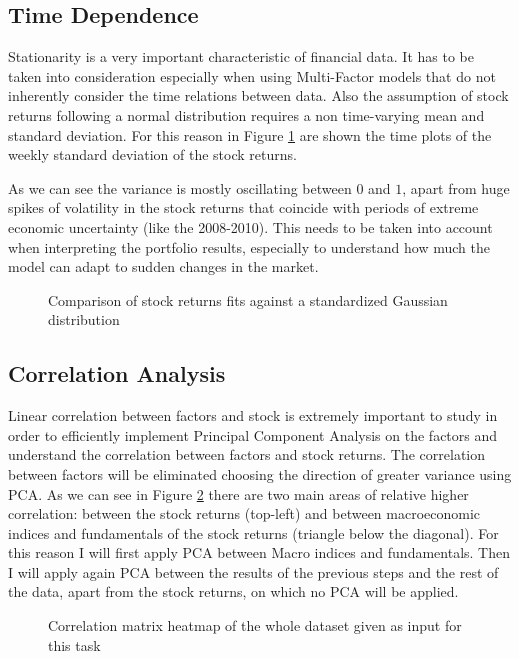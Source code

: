 \subsection{Time Dependence}
Stationarity is a very important characteristic of financial data. It has to be taken into consideration especially when using Multi-Factor models that do not inherently consider the time relations between data. Also the assumption of stock returns following a normal distribution requires a non time-varying mean and standard deviation. For this reason in Figure \ref{fig:stock-std-plot} are shown the time plots of the weekly standard deviation of the stock returns.

As we can see the variance is mostly oscillating between $0$ and $1$, apart from huge spikes of volatility in the stock returns that coincide with periods of extreme economic uncertainty (like the 2008-2010). This needs to be taken into account when interpreting the portfolio results, especially to understand how much the model can adapt to sudden changes in the market.

\begin{figure}[htb]
\centering

\caption{Comparison of stock returns fits against a standardized Gaussian distribution}
\label{fig:stock-std-plot}
\end{figure}


\subsection{Correlation Analysis}
Linear correlation between factors and stock is extremely important to study in order to efficiently implement Principal Component Analysis on the factors and understand the correlation between factors and stock returns. The correlation between factors will be eliminated choosing the direction of greater variance using PCA. As we can see in Figure \ref{fig:correlation-heatmap} there are two main areas of relative higher correlation: between the stock returns (top-left) and between macroeconomic indices and fundamentals of the stock returns (triangle below the diagonal).
For this reason I will first apply PCA between Macro indices and fundamentals. Then I will apply again PCA between the results of the previous steps and the rest of the data, apart from the stock returns, on which no PCA will be applied.

\begin{figure}[htb]
\centering

\caption{Correlation matrix heatmap of the whole dataset given as input for this task}
\label{fig:correlation-heatmap}
\end{figure}

